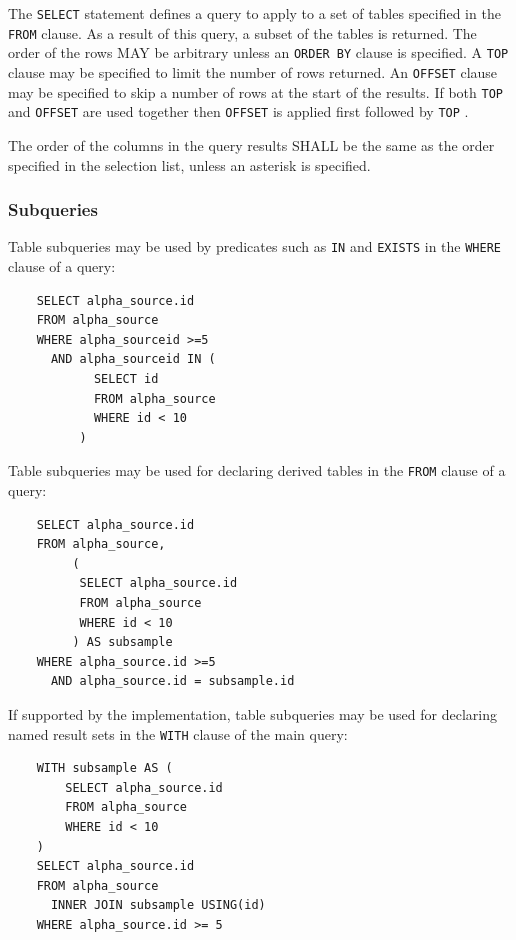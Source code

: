 \documentclass[11pt,a4paper]{ivoa}
\begin{document}
The \verb:SELECT: statement defines a query to apply to a set of tables specified
in the \verb:FROM: clause. As a result of this query, a subset of the tables
is returned.
The order of the rows MAY be arbitrary unless an \verb:ORDER BY: clause is specified.
A \verb:TOP: clause may be specified to limit the number of rows returned.
An \verb:OFFSET: clause may be specified to skip a number of rows at the start
of the results.
If both \verb:TOP: and \verb:OFFSET: are used together then \verb:OFFSET: is applied
first followed by \verb:TOP: .

The order of the columns in the query results SHALL be the same as the
order specified in the selection list,
unless an asterisk is specified.

\subsubsection{Subqueries}
\label{sec:subqueries}

Table subqueries may be used by predicates such as \verb:IN: and \verb:EXISTS:
in the \verb:WHERE: clause of a query:

\begin{verbatim}
    SELECT alpha_source.id
    FROM alpha_source
    WHERE alpha_sourceid >=5
      AND alpha_sourceid IN (
            SELECT id
            FROM alpha_source
            WHERE id < 10
          )
\end{verbatim}

Table subqueries may be used for declaring derived tables in the \verb:FROM: clause
of a query:

\begin{verbatim}
    SELECT alpha_source.id
    FROM alpha_source,
         (
          SELECT alpha_source.id
          FROM alpha_source
          WHERE id < 10
         ) AS subsample
    WHERE alpha_source.id >=5
      AND alpha_source.id = subsample.id
\end{verbatim}

If supported by the implementation, table subqueries may be used for declaring
named result sets in the \verb:WITH: clause of the main query:

\begin{verbatim}
    WITH subsample AS (
        SELECT alpha_source.id
        FROM alpha_source
        WHERE id < 10
    )
    SELECT alpha_source.id
    FROM alpha_source
      INNER JOIN subsample USING(id)
    WHERE alpha_source.id >= 5
\end{verbatim}
\end{document}
